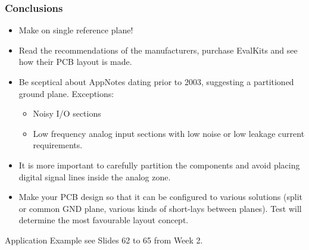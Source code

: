 			\subsubsection{Conclusions}
			\begin{itemize}
				\item Make on single reference plane!
				\item Read the recommendations of the manufacturers, purchase EvalKits and see how their PCB layout is made. 
				\item Be sceptical about AppNotes dating prior to 2003, suggesting a partitioned ground plane. Exceptions: 
				\begin{itemize}
					\item Noisy I/O sections
					\item Low frequency analog input sections with low noise or low leakage current requirements. 
				\end{itemize}
				\item It is more important to carefully partition the components and avoid placing digital signal lines inside the analog zone. 
				\item Make your PCB design so that it can be configured to various solutions (split or common GND plane, various kinds of short-lays between planes). Test will determine the most favourable layout concept. 
			\end{itemize}
			Application Example see Slides 62 to 65 from Week 2. 